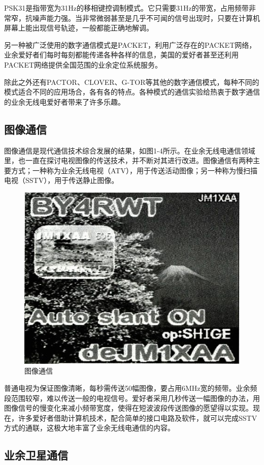 \documentclass[12pt,UTF8]{ctexbook}
\begin{document}
PSK31是指带宽为31Hz的移相键控调制模式。它只需要31Hz的带宽，占用频带非常窄，抗噪声能力强。当非常微弱甚至是几乎不可闻的信号出现时，只要在计算机屏幕上能出现信号轨迹，一般都能正确地解调。

另一种被广泛使用的数字通信模式是PACKET，利用广泛存在的PACKET网络，业余爱好者们每时每刻都能传递各种各样的信息，美国的爱好者甚至还利用PACKET网络提供全国范围的业余定位系统服务。

除此之外还有PACTOR、CLOVER、G-TOR等其他的数字通信模式，每种不同的模式适合不同的应用场合，各有各的特点。各种模式的通信实验给热衷于数字通信的业余无线电爱好者带来了许多乐趣。

\subsection{图像通信}

图像通信是现代通信技术综合发展的结果，如图1-4所示。在业余无线电通信领域里，也一直在探讨电视图像的传送技术，并不断对其进行改进。图像通信有两种主要方式；一种称为业余无线电视（ATV），用于传送活动图像；另一种称为慢扫描电视（SSTV），用于传送静止图像。

\begin{figure}[htbp]
	\centering
	\includegraphics[width=0.7\linewidth]{4}
	\caption{图像通信}
	\label{fig:1}
\end{figure}

普通电视为保证图像清晰，每秒需传送50幅图像，要占用6MHz宽的频带。业余频段范围较窄，难以传送一般的电视信号。爱好者采用几秒传送一幅图像的办法，用图像信号的慢变化来减小频带宽度，使得在短波波段传送图像的愿望得以实现。现在，许多爱好者借助计算机技术，配合简单的接口电路及软件，就可以完成SSTV方式的通联，这极大地丰富了业余无线电通信的内容。

\subsection{业余卫星通信}
\end{document}
